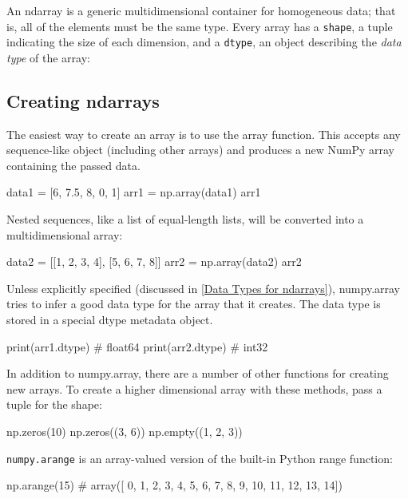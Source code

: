 An ndarray is a generic multidimensional container for homogeneous data; that is, all of the elements must be the same type. Every array has a \verb|shape|, a tuple indicating the size of each dimension, and a \verb|dtype|, an object describing the \emph{data type} of the array:

\subsection{Creating ndarrays}
The easiest way to create an array is to use the array function. This accepts any sequence-like object (including other arrays) and produces a new NumPy array containing the passed data.
\begin{pyc}
data1 = [6, 7.5, 8, 0, 1]
arr1 = np.array(data1)
arr1
\end{pyc}

Nested sequences, like a list of equal-length lists, will be converted into a multidimensional array:
\begin{pyc}
data2 = [[1, 2, 3, 4], [5, 6, 7, 8]]
arr2 = np.array(data2)
arr2
\end{pyc}

Unless explicitly specified (discussed in \autoref{Data Types for ndarrays}), numpy.array tries to infer a good data type for the array that it creates. The data type is stored in a special dtype metadata object.
\begin{pyc}
print(arr1.dtype) # float64
print(arr2.dtype) # int32 
\end{pyc}

In addition to numpy.array, there are a number of other functions for creating new arrays. To create a higher dimensional array with these methods, pass a tuple for the shape:
\begin{pyc}
np.zeros(10)
np.zeros((3, 6))
np.empty((1, 2, 3))    
\end{pyc}


\verb|numpy.arange| is an array-valued version of the built-in Python range function:
\begin{pyc}
np.arange(15)
# array([ 0,  1,  2,  3,  4,  5,  6,  7,  8,  9, 10, 11, 12, 13, 14])
\end{pyc}

